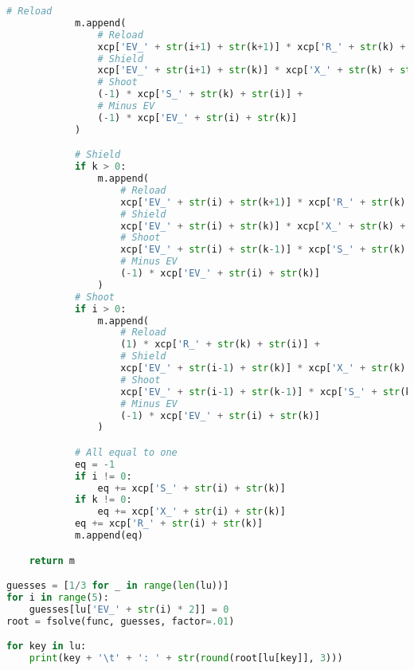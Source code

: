 \documentclass[11pt]{article}
\begin{document}
\begin{lstlisting}[language=Python]
            # Reload
            m.append(
                # Reload
                xcp['EV_' + str(i+1) + str(k+1)] * xcp['R_' + str(k) + str(i)] +
                # Shield
                xcp['EV_' + str(i+1) + str(k)] * xcp['X_' + str(k) + str(i)] +
                # Shoot
                (-1) * xcp['S_' + str(k) + str(i)] +
                # Minus EV
                (-1) * xcp['EV_' + str(i) + str(k)]
            )

            # Shield
            if k > 0:
                m.append(
                    # Reload
                    xcp['EV_' + str(i) + str(k+1)] * xcp['R_' + str(k) + str(i)] +
                    # Shield
                    xcp['EV_' + str(i) + str(k)] * xcp['X_' + str(k) + str(i)] +
                    # Shoot
                    xcp['EV_' + str(i) + str(k-1)] * xcp['S_' + str(k) + str(i)] +
                    # Minus EV
                    (-1) * xcp['EV_' + str(i) + str(k)]
                )
            # Shoot
            if i > 0:
                m.append(
                    # Reload
                    (1) * xcp['R_' + str(k) + str(i)] +
                    # Shield
                    xcp['EV_' + str(i-1) + str(k)] * xcp['X_' + str(k) + str(i)] +
                    # Shoot
                    xcp['EV_' + str(i-1) + str(k-1)] * xcp['S_' + str(k) + str(i)] +
                    # Minus EV
                    (-1) * xcp['EV_' + str(i) + str(k)]
                )

            # All equal to one
            eq = -1
            if i != 0:
                eq += xcp['S_' + str(i) + str(k)]
            if k != 0:
                eq += xcp['X_' + str(i) + str(k)]
            eq += xcp['R_' + str(i) + str(k)]
            m.append(eq)

    return m

guesses = [1/3 for _ in range(len(lu))]
for i in range(5):
    guesses[lu['EV_' + str(i) * 2]] = 0
root = fsolve(func, guesses, factor=.01)

for key in lu:
    print(key + '\t' + ': ' + str(round(root[lu[key]], 3)))
    

\end{lstlisting}
\end{document}
